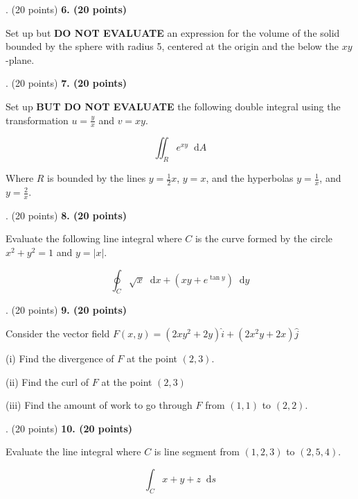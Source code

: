 \documentclass[12pt]{article}
\makeatletter
\newcommand*\dif{\mathop{}\!\mathrm{d}}
\newenvironment{problem}[1][]{%
  \bigskip%
  \noindent\begin{boxedminipage}{\columnwidth}%
  \def\@tempa{#1}%
  \ifx\@tempa\empty\else%
    \textbf{#1}\hspace{0.5em}%
  \fi%
}{%
  \end{boxedminipage}%
}
\makeatother
\begin{document}
\newpage
\begin{problem}[6. (20 points)]
Set up but \textbf{DO NOT EVALUATE} an expression for the volume of the solid bounded by the sphere with radius 5, centered at the origin and the below the $xy$-plane. 
\end{problem}


\newpage
\begin{problem}[7. (20 points)]
Set up \textbf{BUT DO NOT EVALUATE} the following double integral using the transformation $u = \frac{y}{x}$ and $v = xy$.

\begin{equation*}
\iint_R e^{xy} \dif{A}
\end{equation*}

\vspace{.25cm}

Where $R$ is bounded by the lines $y=\frac{1}{2}x$, $y=x$, and the hyperbolas $y=\frac{1}{x}$, and $y=\frac{2}{x}$.

\end{problem}


\newpage
\begin{problem}[8. (20 points)]
Evaluate the following line integral where $C$ is the curve formed by the circle $x^2+y^2=1$ and $y = |x|$.

\begin{equation*}
    \oint_C \sqrt{x}\dif{x} +  (xy +e^{\tan{y}}) \dif{y}
\end{equation*}

\end{problem}



\newpage
\begin{problem}[9. (20 points)]
Consider the vector field $F(x,y) = (2xy^2+2y) \hat{i} + (2x^2y+2x)\hat{j}$

\vspace{.125cm}


(i) Find the divergence of $F$ at the point $(2,3)$.

\vspace{.125cm}

(ii) Find the curl of $F$ at the point $(2,3)$


\vspace{.125cm}

(iii) Find the amount of work to go through $F$ from $(1,1)$ to $(2,2)$.

\end{problem}



\newpage
\begin{problem}[10. (20 points)]
Evaluate the line integral where $C$ is line segment from $(1,2,3)$ to $(2,5,4)$.

\begin{equation*}
    \int_C x+y+z \dif{s}
\end{equation*}


\end{problem}
\end{document}
